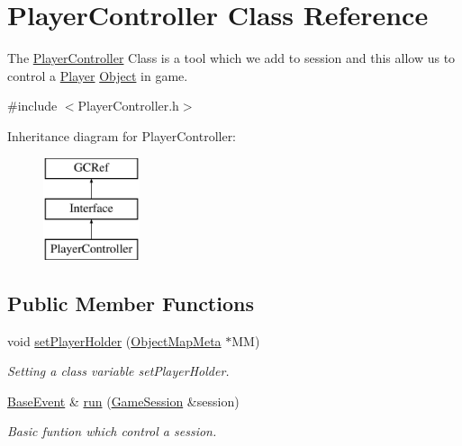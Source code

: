 \hypertarget{classPlayerController}{}\section{Player\+Controller Class Reference}
\label{classPlayerController}


The \hyperlink{classPlayerController}{Player\+Controller} Class is a tool which we add to session and this allow us to control a \hyperlink{classPlayer}{Player} \hyperlink{classObject}{Object} in game.  




{\ttfamily \#include $<$Player\+Controller.\+h$>$}

Inheritance diagram for Player\+Controller\+:\begin{figure}[H]
\begin{center}
\leavevmode
\includegraphics[height=3.000000cm]{classPlayerController}
\end{center}
\end{figure}
\subsection*{Public Member Functions}
\begin{DoxyCompactItemize}
\item 
void \hyperlink{classPlayerController_a1d348ae7dbf9730dde7b6c76e27b2d4b}{set\+Player\+Holder} (\hyperlink{classObjectMapMeta}{Object\+Map\+Meta} $\ast$M\+M)
\begin{DoxyCompactList}\small\item\em Setting a class variable set\+Player\+Holder. \end{DoxyCompactList}\item 
\hypertarget{classPlayerController_a062dc3debb7d14f2fc755b1b44ae7d07}{}\hyperlink{classBaseEvent}{Base\+Event} \& \hyperlink{classPlayerController_a062dc3debb7d14f2fc755b1b44ae7d07}{run} (\hyperlink{classGameSession}{Game\+Session} \&session)\label{classPlayerController_a062dc3debb7d14f2fc755b1b44ae7d07}

\begin{DoxyCompactList}\small\item\em Basic funtion which control a session. \end{DoxyCompactList}\end{DoxyCompactItemize}


